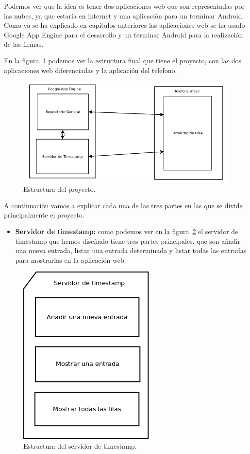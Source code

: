 Podemos ver que la idea es tener dos aplicaciones web que son representadas por las nubes, ya que estaría en internet y una aplicación para un terminar Android. Como ya se ha explicado en capítulos anteriores las aplicaciones web se ha usado Google App Engine para el desarrollo y un terminar Android para la realización de las firmas. 

En la figura~\ref{fig:estructura} podemos ver la estructura final que tiene el proyecto, con las dos aplicaciones web diferenciadas y la aplicación del telefono.

\begin{figure}
  \centering
    \includegraphics[scale=0.3]{./DisenhoYArquitectura/imagenes/estructura.png}
  \caption{Estructura del proyecto.}
  \label{fig:estructura}
\end{figure}

A continuación vamos a explicar cada una de las tres partes en las que se divide principalmente el proyecto.

\begin{itemize}
\item \textbf{Servidor de timestamp:} como podemos ver en la figura~\ref{fig:servertimestamp} el servidor de timestamp que hemos diseñado tiene tres partes principales, que son añadir una nueva entrada, listar una entrada determinada y listar todas las entradas para mostrarlas en la aplicación web.  
\end{itemize}

\begin{figure}
  \centering
    \includegraphics[scale=0.3]{./DisenhoYArquitectura/imagenes/servertimestamp.png}
  \caption{Estructura del servidor de timestamp.}
  \label{fig:servertimestamp}
\end{figure}

